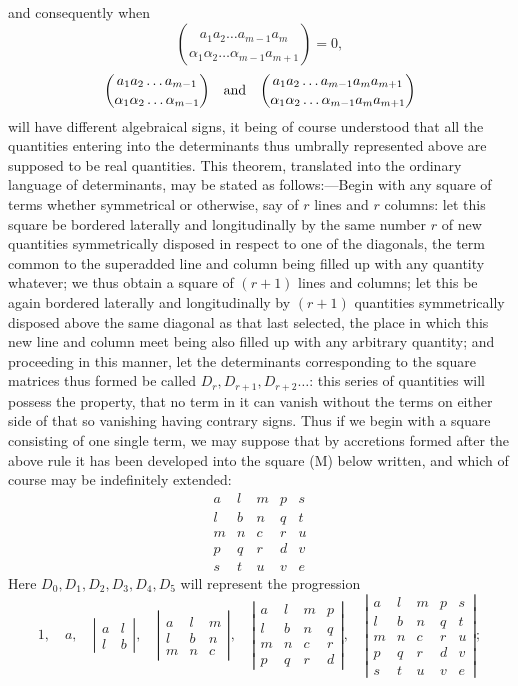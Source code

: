 \documentclass[11pt]{article}
\newcommand{\sourcepage}[1]{\marginpar{\scriptsize p.~#1}}
\begin{document}
\sourcepage{454}
and consequently when
\[
\binom{a_1a_2\ldots a_{m-1}a_m}{\alpha_1\alpha_2\ldots\alpha_{m-1}a_{m+1}}=0,
\]
\[
\binom{a_1a_2\ldots a_{m-1}}{\alpha_1\alpha_2\ldots\alpha_{m-1}}
\quad\hbox{and}\quad
\binom{a_1a_2\ldots a_{m-1}a_ma_{m+1}}{\alpha_1\alpha_2\ldots\alpha_{m-1}a_ma_{m+1}}
\]
will have different algebraical signs, it being of course understood that all the quantities entering into the determinants thus umbrally represented above are supposed to be real quantities. This theorem, translated into the ordinary language of determinants, may be stated as follows:---Begin with any square of terms whether symmetrical or otherwise, say of $r$ lines and $r$ columns: let this square be bordered laterally and longitudinally by the same number $r$ of new quantities symmetrically disposed in respect to one of the diagonals, the term common to the superadded line and column being filled up with any quantity whatever; we thus obtain a square of $(r+1)$ lines and columns; let this be again bordered laterally and longitudinally by $(r+1)$ quantities symmetrically disposed above the same diagonal as that last selected, the place in which this new line and column meet being also filled up with any arbitrary quantity; and proceeding in this manner, let the determinants corresponding to the square matrices thus formed be called $D_r,D_{r+1},D_{r+2}\ldots$: this series of quantities will possess the property, that no term in it can vanish without the terms on either side of that so vanishing having contrary signs. Thus if we begin with a square consisting of one single term, we may suppose that by accretions formed after the above rule it has been developed into the square (M) below written, and which of course may be indefinitely extended:
\[
\begin{array}{ccccc}
a&l&m&p&s\\
l&b&n&q&t\\
m&n&c&r&u\\
p&q&r&d&v\\
s&t&u&v&e
\end{array}
\tag{M}
\]
Here $D_0,D_1,D_2,D_3,D_4,D_5$ will represent the progression
\[
1,\quad a,\quad
\left|\begin{array}{cc}a&l\\ l&b\end{array}\right|,\quad
\left|\begin{array}{ccc}a&l&m\\ l&b&n\\ m&n&c\end{array}\right|,\quad
\left|\begin{array}{cccc}a&l&m&p\\ l&b&n&q\\ m&n&c&r\\ p&q&r&d\end{array}\right|,\quad
\left|\begin{array}{ccccc}a&l&m&p&s\\ l&b&n&q&t\\ m&n&c&r&u\\ p&q&r&d&v\\ s&t&u&v&e\end{array}\right|;
\tag{II}
\]
\end{document}

